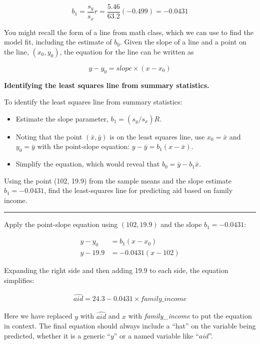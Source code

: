 \documentclass[
  10pt,
  openany]{book}
\providecommand{\tightlist}{%
  \setlength{\itemsep}{0pt}\setlength{\parskip}{0pt}}
\theoremstyle{definition}
\theoremstyle{definition}
\theoremstyle{definition}
\theoremstyle{definition}
\theoremstyle{remark}
\begin{document}
\[b_1 = \frac{s_y}{s_x} r = \frac{5.46}{63.2}(-0.499) = -0.0431\]

You might recall the form of a line from math class, which we can use to find the model fit, including the estimate of \(b_0\). Given the slope of a line and a point on the line, \((x_0, y_0)\), the equation for the line can be written as

\[y - y_0 = slope\times (x - x_0)\]

\textbf{Identifying the least squares line from summary statistics.}

To identify the least squares line from summary statistics:

\begin{itemize}
\tightlist
\item
  Estimate the slope parameter, \(b_1 = (s_y / s_x) R\).
\item
  Noting that the point \((\bar{x}, \bar{y})\) is on the least squares line, use \(x_0 = \bar{x}\) and \(y_0 = \bar{y}\) with the point-slope equation: \(y - \bar{y} = b_1 (x - \bar{x})\).
\item
  Simplify the equation, which would reveal that \(b_0 = \bar{y} - b_1 \bar{x}\).
\end{itemize}

Using the point (102, 19.9) from the sample means and the slope estimate \(b_1 = -0.0431\), find the least-squares line for predicting aid based on family income.

\begin{center}\rule{0.5\linewidth}{0.5pt}\end{center}

Apply the point-slope equation using \((102, 19.9)\) and the slope \(b_1 = -0.0431\):

\[\begin{aligned}
y - y_0  &= b_1 (x - x_0) \\
y - 19.9 &= -0.0431(x - 102)
\end{aligned}\]

Expanding the right side and then adding 19.9 to each side, the equation simplifies:

\[\begin{aligned}
\widehat{aid} = 24.3 - 0.0431 \times \textit{family_income}
\end{aligned}\]

Here we have replaced \(y\) with \(\widehat{aid}\) and \(x\) with \emph{family\_income} to put the equation in context.
The final equation should always include a ``hat'' on the variable being predicted, whether it is a generic ``\(y\)'' or a named variable like ``\(aid\)''.
\end{document}
